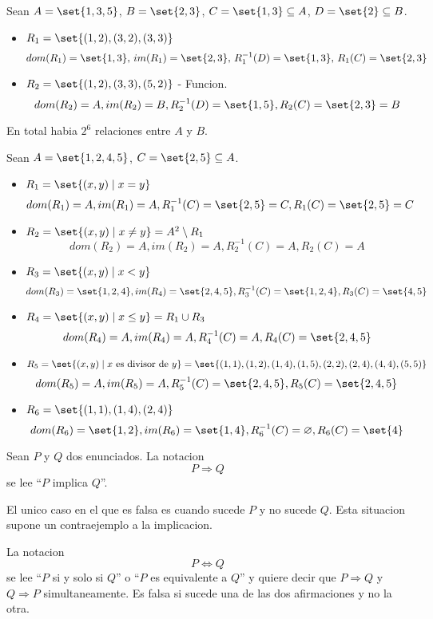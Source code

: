 \begin{example}
	Sean \(A = \set{1,3,5 }\), \(B = \set{2,3 }\), \(C = \set{1,3} \subseteq A \), \(D = \set{2} \subseteq B \).
	\begin{itemize}
		\item \(R_1  = \set{(1,2),(3,2), (3,3)}\)
		      \[
			      dom(R_1) = \set{1,3}, \, im(R_1) = \set{2,3}, \,R^{-1}_1(D) = \set{1,3}, \, R_1(C) = \set{2,3}
		      \]
		\item \(R_2 = \set{(1,2), (3,3), (5,2)}\) - Funcion.
		      \[
			      dom(R_2) = A, im(R_2) = B, R^{-1}_2(D) = \set{1,5}, R_2(C) = \set{2,3} =B
		      \]
	\end{itemize}
	En total habia \(2^{6}  \) relaciones entre \(A \) y \(B \).
\end{example}

\begin{example}
	Sean \(A = \set{1,2,4,5}\), \(C = \set{2,5} \subseteq A \).
	\begin{itemize}
		\item \(R_1 = \set{(x,y) \mid x = y }\)
		      \[
			      dom(R_1) = A, im(R_1) = A, R^{-1}_1 (C) = \set{2,5} =C, R_1(C) = \set{2,5} =C
		      \]
		\item \(R_2 = \set{(x,y) \mid x \neq y } = A^{2} \setminus R_1 \)
		      \[
			      dom(R_2) = A, im(R_2) = A, R^{-1}_2 (C) = A, R_2 (C) = A
		      \]
		\item \(R_3 = \set{(x,y) \mid x < y }\)
		      \[
			      dom(R_3) = \set{1,2,4}, im(R_4) = \set{2,4,5}, R^{-1}_3 (C) = \set{1,2,4}, R_3 (C) = \set{4,5}
		      \]
		\item \(R_4 = \set{(x,y) \mid x \leq y } = R_1 \cup R_3\)
		      \[
			      dom(R_4) = A, im(R_4)=A, R^{-1}_4 (C) = A, R_4 (C) = \set{2,4,5}
		      \]
		\item \(R_5 = \set{(x,y) \mid x \text{ es divisor de } y} = \set{(1,1), (1,2), (1,4), (1,5), (2,2), (2,4), (4,4), (5,5)}\)
		      \[
			      dom(R_5) = A, im(R_5) = A, R^{-1}_5(C) = \set{2,4,5}, R_5(C) = \set{2,4,5}
		      \]
		\item \(R_6 = \set{(1,1), (1,4), (2,4 )}\)
		      \[
			      dom(R_6) = \set{1,2}, im(R_6) = \set{1,4}, R^{-1}_6(C)=\varnothing, R_6(C) = \set{4}
		      \]
	\end{itemize}
\end{example}

\begin{definition}
	Sean \(P \) y \(Q\) dos enunciados. La notacion
	\[
		P \Rightarrow Q
	\] se lee ``\(P \) implica \(Q \)''.

	El unico caso en el que es falsa es cuando sucede \(P \) y no sucede \(Q \). Esta situacion supone un contraejemplo a la implicacion.

	La notacion
	\[
		P \iff  Q
	\]
	se lee ``\(P \) si y solo si \(Q \)'' o ``\(P \) es equivalente a \(Q \)'' y quiere decir que \(P \Rightarrow Q \) y \(Q \Rightarrow P \) simultaneamente. Es falsa si sucede una de las dos afirmaciones y no la otra.
\end{definition}

